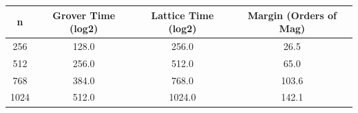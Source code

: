 \begin{tabular}{cccc}
\hline
n & Grover Time (log2) & Lattice Time (log2) & Margin (Orders of Mag) \\
\hline
256 & 128.0 & 256.0 & 26.5 \\
512 & 256.0 & 512.0 & 65.0 \\
768 & 384.0 & 768.0 & 103.6 \\
1024 & 512.0 & 1024.0 & 142.1 \\
\hline
\end{tabular}
